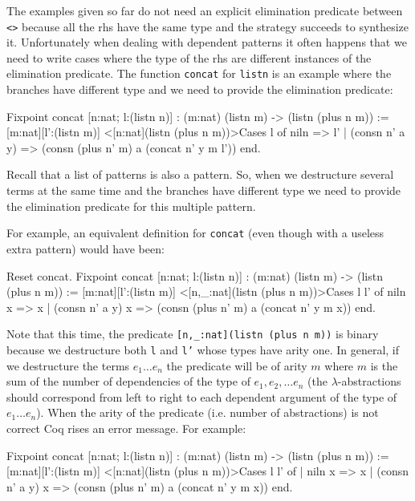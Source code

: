 The examples  given so far do not need an explicit elimination predicate
between \texttt{<>} because all the rhs have the same type and the
strategy succeeds to synthesize it.
Unfortunately when dealing with dependent patterns it often happens
that we need to write cases where the type of the rhs are 
different  instances of the elimination  predicate.
The function  \texttt{concat} for \texttt{listn}
is an example where the branches have different type
and we need to provide the elimination predicate:

\begin{coq_example}
Fixpoint concat [n:nat; l:(listn n)]
 :  (m:nat) (listn m) -> (listn (plus n m))
 := [m:nat][l':(listn m)] 
      <[n:nat](listn (plus n m))>Cases l  of 
         niln          => l'
      | (consn n' a y) => (consn (plus n' m) a (concat n' y m l'))
      end.
\end{coq_example}

Recall that a list of patterns is also a pattern. So, when
we destructure several terms at the same time and the branches have
different type  we need to provide
the elimination predicate for this multiple pattern.

For example, an equivalent definition for \texttt{concat} (even though with a useless extra pattern) would have
been:

\begin{coq_example}
Reset concat.
Fixpoint concat [n:nat; l:(listn n)] : (m:nat) (listn m) -> (listn (plus n m)) 
:= [m:nat][l':(listn m)] 
    <[n,_:nat](listn (plus n m))>Cases l l' of 
                     niln          x => x
                  | (consn n' a y) x => (consn (plus n' m) a (concat n' y m x))
                  end.
\end{coq_example}

Note that this time, the predicate \texttt{[n,\_:nat](listn (plus n
  m))}  is binary because we
destructure both \texttt{l} and \texttt{l'} whose types have arity one.
In general, if we destructure the terms $e_1\ldots e_n$
the predicate will be of arity $m$ where $m$ is the sum of the
number of dependencies of the type of $e_1, e_2,\ldots e_n$ 
(the $\lambda$-abstractions
should correspond from left to right to each dependent argument of the
type of $e_1\ldots e_n$).
When the arity of the predicate (i.e. number of abstractions) is not
correct Coq rises an error message. For example:

\begin{coq_example}
Fixpoint concat [n:nat; l:(listn n)] 
     : (m:nat) (listn m) -> (listn (plus n m)) := 
  [m:nat][l':(listn m)] 
   <[n:nat](listn (plus n m))>Cases l l' of 
        | niln          x => x
        | (consn n' a y) x => (consn (plus n' m) a (concat n' y m x))
        end.
\end{coq_example}

